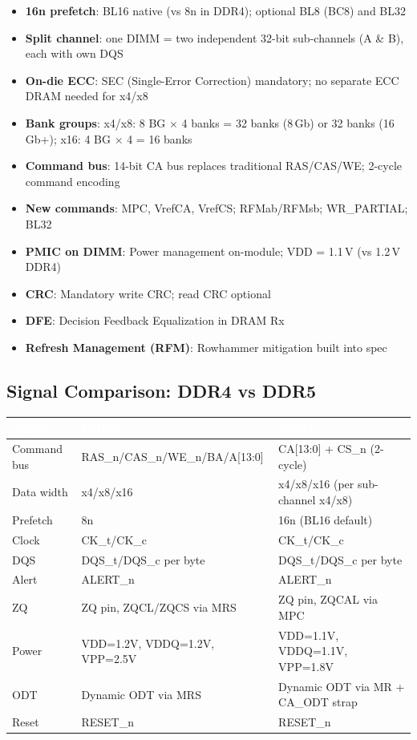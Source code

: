 \documentclass[10pt,a4paper,twoside]{article}
\newcommand{\thd}[1]{\cellcolor{navyblue}\textcolor{white}{\textbf{#1}}}
\newcommand{\trow}{\rowcolor{lightgray}}
\newcommand{\talt}{\rowcolor{skyblue!30}}
\begin{document}
\begin{itemize}
  \item \textbf{16n prefetch}: BL16 native (vs 8n in DDR4); optional BL8 (BC8) and BL32
  \item \textbf{Split channel}: one DIMM = two independent 32-bit sub-channels (A \& B), each with own DQS
  \item \textbf{On-die ECC}: SEC (Single-Error Correction) mandatory; no separate ECC DRAM needed for x4/x8
  \item \textbf{Bank groups}: x4/x8: 8 BG $\times$ 4 banks = 32 banks (8\,Gb) or 32 banks (16\,Gb+); x16: 4 BG $\times$ 4 = 16 banks
  \item \textbf{Command bus}: 14-bit CA bus replaces traditional RAS/CAS/WE; 2-cycle command encoding
  \item \textbf{New commands}: MPC, VrefCA, VrefCS; RFMab/RFMsb; WR\_PARTIAL; BL32
  \item \textbf{PMIC on DIMM}: Power management on-module; VDD = 1.1\,V (vs 1.2\,V DDR4)
  \item \textbf{CRC}: Mandatory write CRC; read CRC optional
  \item \textbf{DFE}: Decision Feedback Equalization in DRAM Rx
  \item \textbf{Refresh Management (RFM)}: Rowhammer mitigation built into spec
\end{itemize}

\subsection{Signal Comparison: DDR4 vs DDR5}

\begin{center}
\begin{tabularx}{\linewidth}{@{} l X X @{}}
\toprule
\thd{Signal} & \thd{DDR4} & \thd{DDR5} \\
\midrule
\trow Command bus & RAS\_n/CAS\_n/WE\_n/BA/A[13:0] & CA[13:0] + CS\_n (2-cycle) \\
\talt Data width & x4/x8/x16 & x4/x8/x16 (per sub-channel x4/x8) \\
\trow Prefetch & 8n & 16n (BL16 default) \\
\talt Clock & CK\_t/CK\_c & CK\_t/CK\_c \\
\trow DQS & DQS\_t/DQS\_c per byte & DQS\_t/DQS\_c per byte \\
\talt Alert & ALERT\_n & ALERT\_n \\
\trow ZQ & ZQ pin, ZQCL/ZQCS via MRS & ZQ pin, ZQCAL via MPC \\
\talt Power & VDD=1.2V, VDDQ=1.2V, VPP=2.5V & VDD=1.1V, VDDQ=1.1V, VPP=1.8V \\
\trow ODT & Dynamic ODT via MRS & Dynamic ODT via MR + CA\_ODT strap \\
\talt Reset & RESET\_n & RESET\_n \\
\bottomrule
\end{tabularx}
\end{center}
\end{document}
